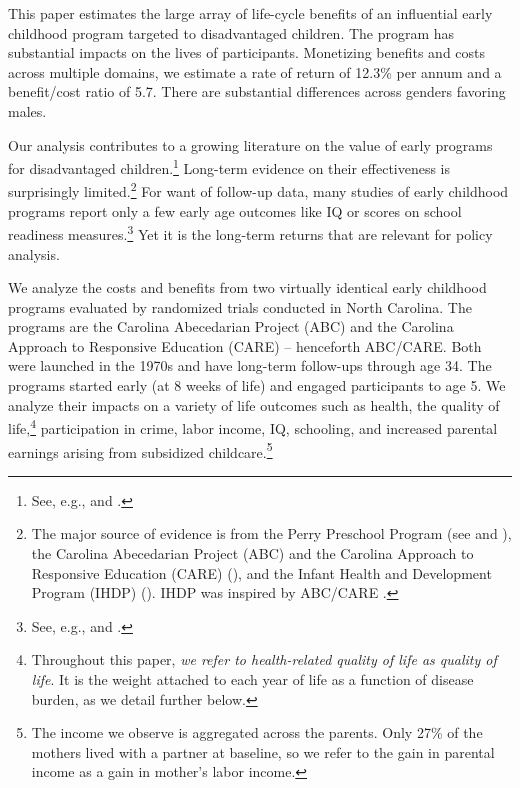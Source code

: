 This paper estimates the large array of life-cycle benefits of an influential early childhood program targeted to disadvantaged children. The program has substantial impacts on the lives of participants. Monetizing benefits and costs across multiple domains, we estimate a rate of return of 12.3\% per annum and a benefit/cost ratio of 5.7. There are substantial differences across genders favoring males.

Our analysis contributes to a growing literature on the value of early programs for disadvantaged children.\footnote{See, e.g., \cite{Currie_2011_AER} and \cite{Elango_Hojman_etal_2016_Early-Edu}.} Long-term evidence on their effectiveness is surprisingly limited.\footnote{The major source of evidence is from the Perry Preschool Program (see \citealp{Schweinhart_Montie_ea_2005_BOOKlifetime} and \citealp{Heckman_Moon_etal_2010_RateofReturn,Heckman_Moon_etal_2010_QE}), the Carolina Abecedarian Project (ABC) and the Carolina Approach to Responsive Education (CARE) (\citealp{Ramey_Campbell_etal_2000_ADS,Ramey-etal_2012-ABC}), and the Infant Health and Development Program (IHDP) (\citealp{Gross_Spiker_etal_1997_BOOKHelpinglowbirth,Duncan_Sojourner_2013_JHR}). IHDP was inspired by ABC/CARE \citep[][]{Gross_Spiker_etal_1997_BOOKHelpinglowbirth}.} For want of follow-up data, many studies of early childhood programs report only a few early age outcomes like IQ or scores on school readiness measures.\footnote{See, e.g., \cite{Kline_Walters_2016_QJE} and \cite{Weiland_2013_CD_Impacts-of-Pre-K}.} Yet it is the long-term returns that are relevant for policy analysis.

We analyze the costs and benefits from two virtually identical early childhood programs evaluated by randomized trials conducted in North Carolina. The programs are the Carolina Abecedarian Project (ABC) and the Carolina Approach to Responsive Education (CARE) -- henceforth ABC/CARE. Both were launched in the 1970s and have long-term follow-ups through age 34. The programs started early (at 8 weeks of life) and engaged participants to age 5. We analyze their impacts on a variety of life outcomes such as health, the quality of life,\footnote{Throughout this paper, \textit{we refer to health-related quality of life as quality of life}. It is the weight attached to each year of life as a function of disease burden, as we detail further below.} participation in crime, labor income, IQ, schooling, and increased parental earnings arising from subsidized childcare.\footnote{The income we observe is aggregated across the parents. Only 27\% of the mothers lived with a partner at baseline, so we refer to the gain in parental income as a gain in mother's labor income.}

